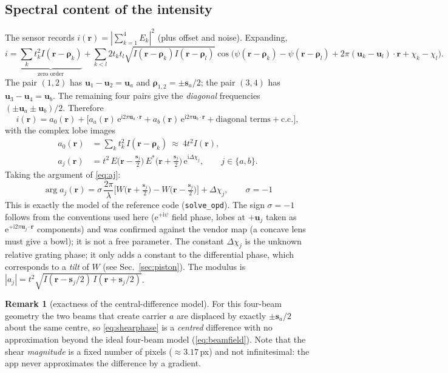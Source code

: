 \documentclass[11pt,a4paper]{article}
\theoremstyle{definition}
\newtheorem{remark}{Remark}
\newcommand{\vr}{\bm{r}}
\newcommand{\vs}{\bm{s}}
\newcommand{\vu}{\bm{u}}
\newcommand{\ii}{\mathrm{i}}
\newcommand{\ee}{\mathrm{e}}
\newcommand{\code}[1]{\texttt{\small #1}}
\begin{document}
\subsection{Spectral content of the intensity}
The sensor records $i(\vr)=|\sum_{k=1}^4E_k|^2$ (plus offset and noise). Expanding,
\begin{equation}
i=\underbrace{\sum_k t_k^2 I(\vr-\bm\rho_k)}_{\text{zero order}}
+\sum_{k<l}2t_kt_l\sqrt{I(\vr-\bm\rho_k)I(\vr-\bm\rho_l)}\cos\!\Big(\psi(\vr-\bm\rho_k)-\psi(\vr-\bm\rho_l)+2\pi(\vu_k-\vu_l)\!\cdot\!\vr+\chi_k-\chi_l\Big).
\label{eq:intensity_expand}
\end{equation}
The pair $(1,2)$ has $\vu_1-\vu_2=\vu_a$ and $\bm\rho_{1,2}=\pm\vs_a/2$; the pair $(3,4)$ has $\vu_3-\vu_4=\vu_b$. The remaining four pairs give the
\emph{diagonal} frequencies $(\pm\vu_a\pm\vu_b)/2$. Therefore
\begin{equation}
i(\vr)=a_0(\vr)+\Big[a_a(\vr)\,\ee^{\ii2\pi\vu_a\cdot\vr}+a_b(\vr)\,\ee^{\ii2\pi\vu_b\cdot\vr}+\text{diagonal terms}+\text{c.c.}\Big],
\label{eq:lobes}
\end{equation}
with the complex lobe images
\begin{align}
a_0(\vr)&=\sum_k t_k^2\,I(\vr-\bm\rho_k)\ \approx\ 4t^2 I(\vr),\label{eq:a0}\\
a_j(\vr)&=t^2\,E\!\big(\vr-\tfrac{\vs_j}{2}\big)\,E^{*}\!\big(\vr+\tfrac{\vs_j}{2}\big)\,\ee^{\ii\Delta\chi_j},\qquad j\in\{a,b\}.\label{eq:aj}
\end{align}
Taking the argument of \eqref{eq:aj}:
\begin{equation}
\boxed{\ \arg a_j(\vr)=\sigma\,\frac{2\pi}{\lambda}\Big[W\!\big(\vr+\tfrac{\vs_j}{2}\big)-W\!\big(\vr-\tfrac{\vs_j}{2}\big)\Big]+\Delta\chi_j,\qquad \sigma=-1\ }
\label{eq:shearphase}
\end{equation}
This is exactly the model of the reference code (\code{solve\_opd}). The sign $\sigma=-1$ follows from the conventions used here
($\ee^{+\ii\psi}$ field phase, lobes at $+\vu_j$ taken as $\ee^{+\ii2\pi\vu_j\cdot\vr}$ components) and was confirmed against the
vendor map (a concave lens must give a bowl); it is not a free parameter. The constant $\Delta\chi_j$ is the unknown relative grating phase; it only
adds a constant to the differential phase, which corresponds to a \emph{tilt} of $W$ (see Sec.~\ref{sec:piston}).
The modulus is $|a_j|=t^2\sqrt{I(\vr-\vs_j/2)\,I(\vr+\vs_j/2)}$.

\begin{remark}[exactness of the central-difference model]
For this four-beam geometry the two beams that create carrier $a$ are displaced by exactly $\pm\vs_a/2$ about the same centre, so
\eqref{eq:shearphase} is a \emph{centred} difference with no approximation beyond the ideal four-beam model (\eqref{eq:beamfield}). Note that
the shear \emph{magnitude} is a fixed number of pixels ($\approx3.17$\,px) and not infinitesimal: the app never approximates the difference by a gradient.
\end{remark}
\end{document}
